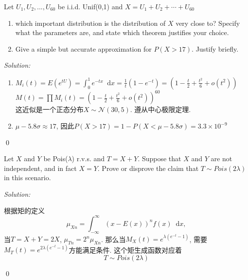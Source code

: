 \documentclass[12pt]{article}
\newenvironment{problem}[2][Problem]{\begin{trivlist}
\item[\hskip \labelsep {\bfseries #1}\hskip \labelsep {\bfseries #2.}]}{\end{trivlist}}
\newenvironment{sol}
    {\emph{Solution:}
    }
    {
    \qed
    }
\newcommand{\intzo}{\int_0^1}                                  %
\renewcommand\d{\mathop{}\!\mathrm{d}}                                            %
\newcommand{\f}[2]{\frac{#1}{#2}}                                      %
\newcommand{\ff}[1]{\frac{1}{#1}}                                      %
\newcommand\e[1]{\times 10^{#1}}                                       %
\renewcommand\l{\lambda}                                               %
\newcommand\sg{\sigma}                                                 %
\begin{document}




\begin{problem}{1}
Let $U_1,U_2,...,U_{60}$ be i.i.d. Unif(0,1) and $X=U_1+U_2+\cdots+U_{60}$
\begin{enumerate}
    \item which important distribution is the distribution of $X$ very close to? Specify what the parameters are, and state which theorem justifies your choice.
    \item Give a simple but accurate approximation for $P(X>17)$. Justify briefly.
\end{enumerate}
\end{problem}
\begin{sol}
    \begin{enumerate}
        \item $M_i(t) = E(e^{tU})=\intzo e^{-tx}\d x = \ff{t}(1-e^{-t}) = (1-\f{t}{2}+\f{t^2}{6}+o(t^2))$\\
        $M(t) = \prod M_i(t) = (1-\f{t}{2}+\f{t^2}{6}+o(t^2))^{60} $\\%
        这近似是一个正态分布$X \sim \mathcal{N}(30,5)$. 遵从中心极限定理. 
        \item $\mu-5.8\sg \approx 17$, 因此$P(X>17) = 1 - P(X<\mu-5.8\sg) = 3.3\e{-9}$
    \end{enumerate}
\end{sol}


\begin{problem}{2} 
Let $X$ and $Y$ be Pois($\lambda$) r.v.s. and $T=X+Y$. Suppose that $X$ and $Y$ are not independent, and in fact $X=Y$. Prove or disprove the claim that $T\sim Pois(2\lambda)$ in this scenario.
\end{problem}
\begin{sol}
根据矩的定义$$\mu_{Xn}=\int _{-\infty }^{\infty }(x-E(x))^{n}f(x)\d x,$$ 当$T=X+Y=2X$, $\mu_{Tn} = 2^n\mu_{Xn}$. 那么当$M_X(t)= e^{\l(e^{-t}-1)}$, 需要$M_T(t)= e^{2\l(e^{-t}-1)}$方能满足条件. 这个矩生成函数对应着$$T\sim Pois(2\lambda)$$
\end{sol}
\end{document}
